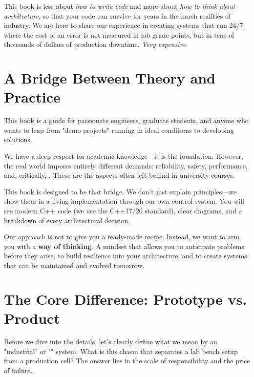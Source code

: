 This book is less about \textit{how to write code} and more about \textit{how to think about architecture}, so that your code can survive for years in the harsh realities of industry. We are here to share our experience in creating systems that run 24/7, where the cost of an error is not measured in lab grade points, but in tens of thousands of dollars of production downtime. \textit{Very expensive}.

\section{A Bridge Between Theory and Practice}

This book is a guide for passionate engineers, graduate students, and anyone who wants to leap from "demo projects" running in ideal conditions to developing  solutions.

We have a deep respect for academic knowledge—it is the foundation. However, the real world imposes entirely different demands: reliability, safety, performance, and, critically, . These are the aspects often left behind in university courses.

This book is designed to be that bridge. We don't just explain principles—we show them in a living implementation through our own control system. You will see modern C++ code (we use the C++17/20 standard), clear diagrams, and a breakdown of every architectural decision.

Our approach is not to give you a ready-made recipe. Instead, we want to arm you with a \textbf{way of thinking}. A mindset that allows you to anticipate problems before they arise, to build resilience into your architecture, and to create systems that can be maintained and evolved tomorrow.

\section{The Core Difference: Prototype vs. Product}

Before we dive into the details, let's clearly define what we mean by an "industrial" or "" system. What is this chasm that separates a lab bench setup from a production cell? The answer lies in the scale of responsibility and the price of failure.


